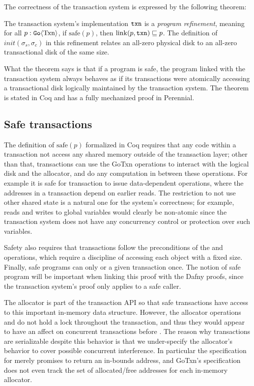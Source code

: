 The correctness of the transaction system is expressed by the following theorem:
%
\begin{theorem}
  The transaction system's implementation $\texttt{txn}$ is a \emph{program refinement}, meaning for
  all $p : \mathtt{Go}\langle \mathrm{Txn} \rangle$, if $\mathrm{safe}(p)$, then
  $\mathrm{link}(p, \texttt{txn}) \sqsubseteq p$. The definition of
  $init(\sigma_{s}, \sigma_{c})$ in this refinement relates an all-zero physical
  disk to an all-zero transactional disk of the same size.
  \label{thm:gotxn-program-refinement}
\end{theorem}
%
What the theorem says is that if a program is safe, the program linked with the
transaction system always behaves as if its transactions were atomically
accessing a transactional disk logically maintained by the transaction system.
The theorem is stated in Coq and has a fully mechanized proof in Perennial.

\subsection{Safe transactions}
\label{sec:txn:safe}

The definition of $\mathrm{safe}(p)$ formalized in Coq requires that any code
within a transaction not access any shared memory outside of the transaction
layer; other than that, transactions can use the GoTxn operations to interact
with the logical disk and the allocator, and do any computation in between these
operations. For example it is safe for transaction to issue data-dependent
operations, where the addresses in a transaction depend on earlier reads. The
restriction to not use other shared state is a natural one for the system's
correctness; for example, reads and writes to global variables would clearly be
non-atomic since the transaction system does not have any concurrency control or
protection over such variables.

Safety also requires that transactions follow the preconditions of the 
and  operations, which require a discipline of accessing each object
with a fixed size. Finally, safe programs can only  or  a
given transaction once. The notion of safe program will be important when
linking this proof with the Dafny proofs, since the transaction system's proof
only applies to a safe caller.

The allocator is part of the transaction API so that safe transactions have
access to this important in-memory data structure. However, the allocator
operations  and  do not hold a lock throughout the
transaction, and thus they would appear to have an affect on concurrent
transactions before . The reason why transactions are serializable
despite this behavior is that we under-specify the allocator's behavior to cover
possible concurrent interference. In particular the specification for 
merely promises to return an in-bounds address, and GoTxn's specification does
not even track the set of allocated/free addresses for each in-memory allocator.

